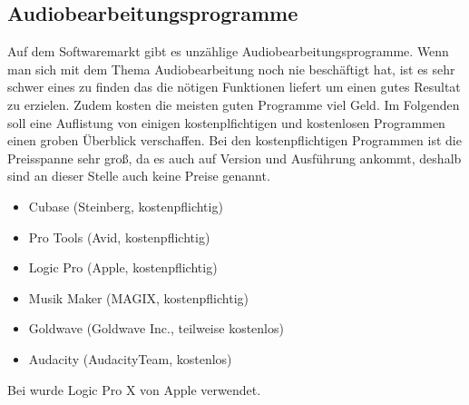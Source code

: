 \subsection{Audiobearbeitungsprogramme}
Auf dem Softwaremarkt gibt es unzählige Audiobearbeitungsprogramme. Wenn man sich mit dem Thema Audiobearbeitung noch nie beschäftigt hat, ist es sehr schwer eines zu finden das die nötigen Funktionen liefert um einen gutes Resultat zu erzielen. Zudem kosten die meisten guten Programme viel Geld. Im Folgenden soll eine Auflistung von einigen kostenplfichtigen und kostenlosen Programmen einen groben Überblick verschaffen. Bei den kostenpflichtigen Programmen ist die Preisspanne sehr groß, da es auch auf Version und Ausführung ankommt, deshalb sind an dieser Stelle auch keine Preise genannt.

\begin{itemize}
 \item Cubase (Steinberg, kostenpflichtig)
 \item Pro Tools (Avid, kostenpflichtig)
 \item Logic Pro (Apple, kostenpflichtig)
 \item Musik Maker (MAGIX, kostenpflichtig)
 \item Goldwave (Goldwave Inc., teilweise kostenlos)
 \item Audacity (AudacityTeam, kostenlos)
 \end{itemize} 

Bei \gamename wurde Logic Pro X von Apple verwendet. 

